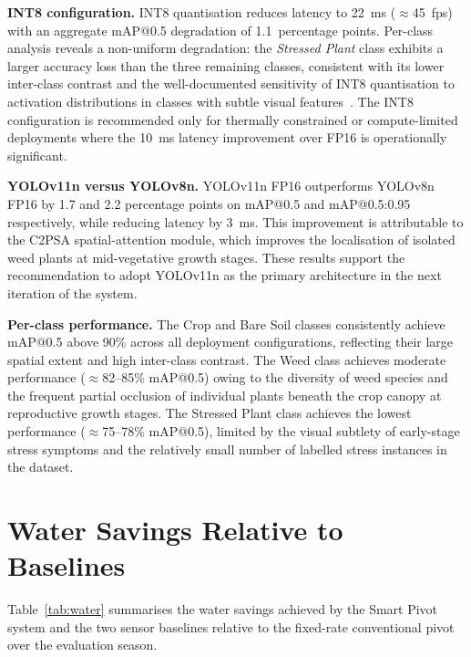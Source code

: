 \documentclass[12pt,a4paper]{report}
\begin{document}
\textbf{INT8 configuration.} INT8 quantisation reduces latency to 22~ms ($\approx$45~fps) with an aggregate mAP@0.5 degradation of 1.1~percentage points. Per-class analysis reveals a non-uniform degradation: the \emph{Stressed Plant} class exhibits a larger accuracy loss than the three remaining classes, consistent with its lower inter-class contrast and the well-documented sensitivity of INT8 quantisation to activation distributions in classes with subtle visual features~\cite{Jacob2018}. The INT8 configuration is recommended only for thermally constrained or compute-limited deployments where the 10~ms latency improvement over FP16 is operationally significant.

\textbf{YOLOv11n versus YOLOv8n.} YOLOv11n FP16 outperforms YOLOv8n FP16 by 1.7 and 2.2 percentage points on mAP@0.5 and mAP@0.5:0.95 respectively, while reducing latency by 3~ms. This improvement is attributable to the C2PSA spatial-attention module, which improves the localisation of isolated weed plants at mid-vegetative growth stages. These results support the recommendation to adopt YOLOv11n as the primary architecture in the next iteration of the system.

\textbf{Per-class performance.} The Crop and Bare Soil classes consistently achieve mAP@0.5 above 90\% across all deployment configurations, reflecting their large spatial extent and high inter-class contrast. The Weed class achieves moderate performance ($\approx$82--85\% mAP@0.5) owing to the diversity of weed species and the frequent partial occlusion of individual plants beneath the crop canopy at reproductive growth stages. The Stressed Plant class achieves the lowest performance ($\approx$75--78\% mAP@0.5), limited by the visual subtlety of early-stage stress symptoms and the relatively small number of labelled stress instances in the dataset.

\section{Water Savings Relative to Baselines}

Table~\ref{tab:water} summarises the water savings achieved by the Smart Pivot system and the two sensor baselines relative to the fixed-rate conventional pivot over the evaluation season.
\end{document}
